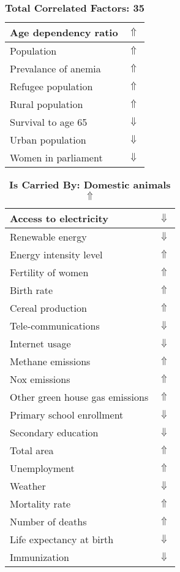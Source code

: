 \documentclass[12pt,notitlepage,oneside]{report}
\begin{document}
\begin{table}[!htb]
\begin{tabular}{|l|l|}
Age dependency ratio & $\Uparrow$\\ \hline
Population & $\Uparrow$\\ \hline
Prevalance of anemia & $\Uparrow$\\ \hline
Refugee population & $\Uparrow$\\ \hline
Rural population & $\Uparrow$\\ \hline
Survival to age 65 & $\Downarrow$\\ \hline
Urban population & $\Downarrow$\\ \hline
Women in parliament & $\Downarrow$\\ \hline
\end{tabular}
\caption*{\textbf{Total Correlated Factors: 35}}
\end{table}
\clearpage
\begin{table}[!htb]
\caption{\textbf{Is Carried By: Domestic animals $\Uparrow$}}
\centering
\label{Correlated Socio-economic Factors0}
\begin{tabular}{|l|l|}
\hline
Access to electricity & $\Downarrow$\\ \hline
Renewable energy & $\Downarrow$\\ \hline
Energy intensity level & $\Uparrow$\\ \hline
Fertility of women & $\Uparrow$\\ \hline
Birth rate & $\Uparrow$\\ \hline
Cereal production & $\Uparrow$\\ \hline
Tele-communications & $\Downarrow$\\ \hline
Internet usage & $\Downarrow$\\ \hline
Methane emissions & $\Uparrow$\\ \hline
Nox emissions & $\Uparrow$\\ \hline
Other green house gas emissions & $\Uparrow$\\ \hline
Primary school enrollment & $\Downarrow$\\ \hline
Secondary education & $\Downarrow$\\ \hline
Total area & $\Uparrow$\\ \hline
Unemployment & $\Uparrow$\\ \hline
Weather & $\Downarrow$\\ \hline
Mortality rate & $\Uparrow$\\ \hline
Number of deaths & $\Uparrow$\\ \hline
Life expectancy at birth & $\Downarrow$\\ \hline
Immunization & $\Downarrow$\\ \hline

\end{tabular}
\end{table}
\end{document}
